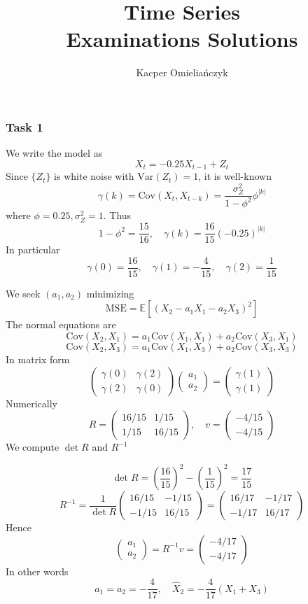 \documentclass[11pt,a4paper]{article}
\newcommand{\EE}{\mathbb E}
\newcommand{\var}{\mathrm{Var}}
\newcommand{\cov}{\mathrm{Cov}}
\begin{document}
    \title{Time Series \\ Examinations Solutions}
    \author{Kacper Omieliańczyk}
    \date{}

    \maketitle
    \subsubsection*{Task 1}
    We write the model as \[ X_t = -0.25 X_{t-1} + Z_t \]
    Since $\{Z_t\}$ is white noise with $\var(Z_t) = 1$, it is well-known
    \[ \gamma(k) = \cov(X_t, X_{t-k}) = \frac{\sigma_Z^2}{1-\phi^2} \phi^{|k|} \]
    where $\phi = 0.25, \sigma_Z^2 = 1$. Thus
    \[ 1 - \phi^2 = \frac{15}{16}, \quad \gamma(k) = \frac{16}{15} (-0.25)^{|k|} \]
    In particular
    \[ \gamma(0) = \frac{16}{15}, \quad \gamma(1) = -\frac4{15}, \quad \gamma(2) = \frac1{15} \]
    
    We seek $(a_1, a_2)$ minimizing
    \[ \mathrm{MSE} = \EE\left[ (X_2 - a_1 X_1 - a_2 X_3)^2 \right] \]
    The normal equations are
    \[ \cov(X_2, X_1) = a_1 \cov(X_1, X_1) + a_2 \cov(X_3, X_1) \]
    \[ \cov(X_2, X_3) = a_1 \cov(X_1, X_3) + a_2 \cov(X_3, X_3) \]
    In matrix form
    \[ \begin{pmatrix} \gamma(0) & \gamma(2) \\ \gamma(2) & \gamma(0) \end{pmatrix} \begin{pmatrix} a_1 \\ a_2 \end{pmatrix} = \begin{pmatrix} \gamma(1) \\ \gamma(1) \end{pmatrix} \]
    Numerically 
    \[ R = \begin{pmatrix} 16/15 & 1/15 \\ 1/15 & 16/15 \end{pmatrix}, \quad v = \begin{pmatrix} -4/15 \\ -4/15 \end{pmatrix} \]
    We compute $\det R$ and $R^{-1}$
    
     \[   \det R = \left(\frac{16}{15}\right)^2 - \left( \frac1{15}\right)^2 = \frac{17}{15} \]
       \[ R^{-1} = \frac1{\det R} \begin{pmatrix} 16/15 & -1/15 \\ -1/15 & 16/15 \end{pmatrix} = \begin{pmatrix} 16/17 & -1/17 \\ -1/17 & 16/17 \end{pmatrix}\]
    Hence
    \[ \begin{pmatrix} a_1 \\ a_2 \end{pmatrix} = R^{-1} v = \begin{pmatrix} -4/17 \\ -4/17 \end{pmatrix} \]
    In other words
    \[ a_1 = a_2 = -\frac{4}{17},\quad \hat X_2 = -\frac{4}{17} (X_1+X_3) \]
\end{document}

